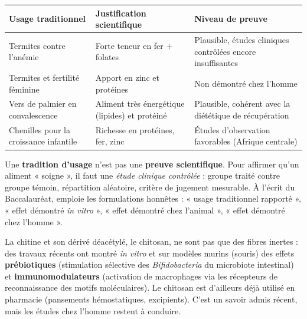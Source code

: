 \documentclass[11pt]{article}
\newcommand{\cle}[1]{{\popxbold\color{popdark}#1}}
\begin{document}
\begin{center}
\begin{tabularx}{\linewidth}{|l|X|X|}
\hline
\rowcolor{popblueL} \textbf{Usage traditionnel} & \textbf{Justification scientifique} & \textbf{Niveau de preuve} \\
\hline
Termites contre l'anémie & Forte teneur en fer + folates & Plausible, études cliniques contrôlées encore insuffisantes \\
\hline
Termites et fertilité féminine & Apport en zinc et protéines & Non démontré chez l'homme \\
\hline
Vers de palmier en convalescence & Aliment très énergétique (lipides) et protéiné & Plausible, cohérent avec la diététique de récupération \\
\hline
Chenilles pour la croissance infantile & Richesse en protéines, fer, zinc & Études d'observation favorables (Afrique centrale) \\
\hline
\end{tabularx}
\end{center}

\begin{attention}
Une \textbf{tradition d'usage} n'est pas une \textbf{preuve scientifique}. Pour affirmer qu'un aliment « soigne », il faut une \emph{étude clinique contrôlée} : groupe traité contre groupe témoin, répartition aléatoire, critère de jugement mesurable. À l'écrit du Baccalauréat, emploie les formulations honnêtes : « usage traditionnel rapporté », « effet démontré \emph{in vitro} », « effet démontré chez l'animal », « effet démontré chez l'homme ».
\end{attention}

\begin{savaistu}
La chitine et son dérivé déacétylé, le \cle{chitosan}, ne sont pas que des fibres inertes : des travaux récents ont montré \emph{in vitro} et sur modèles murins (souris) des effets \textbf{prébiotiques} (stimulation sélective des \emph{Bifidobacteria} du microbiote intestinal) et \textbf{immunomodulateurs} (activation de macrophages via les récepteurs de reconnaissance des motifs moléculaires). Le chitosan est d'ailleurs déjà utilisé en pharmacie (pansements hémostatiques, excipients). C'est un savoir admis récent, mais les études chez l'homme restent à conduire.
\end{savaistu}
\end{document}
